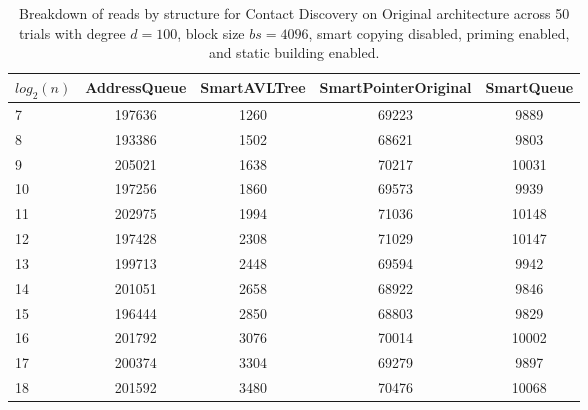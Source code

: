\begin{table}[]
\centering
\begin{tabular}{|l|c|c|c|c|}
$log_2(n)$ & AddressQueue & SmartAVLTree & SmartPointerOriginal & SmartQueue \\ \hline
7 & 197636 & 1260 & 69223 & 9889 \\ \hline
8 & 193386 & 1502 & 68621 & 9803 \\ \hline
9 & 205021 & 1638 & 70217 & 10031 \\ \hline
10 & 197256 & 1860 & 69573 & 9939 \\ \hline
11 & 202975 & 1994 & 71036 & 10148 \\ \hline
12 & 197428 & 2308 & 71029 & 10147 \\ \hline
13 & 199713 & 2448 & 69594 & 9942 \\ \hline
14 & 201051 & 2658 & 68922 & 9846 \\ \hline
15 & 196444 & 2850 & 68803 & 9829 \\ \hline
16 & 201792 & 3076 & 70014 & 10002 \\ \hline
17 & 200374 & 3304 & 69279 & 9897 \\ \hline
18 & 201592 & 3480 & 70476 & 10068 \\ \hline
\end{tabular}
\caption{Breakdown of reads by structure for Contact Discovery on Original architecture across 50 trials with degree $d=100$, block size $bs=4096$, smart copying disabled, priming enabled, and static building enabled.}
    \label{tab:reads_by_structure_cd_d100_bs4096_trials50_copiesfalse_primetrue_staticinsertiontrue_ptoriginal_movefalse}
\end{table}

